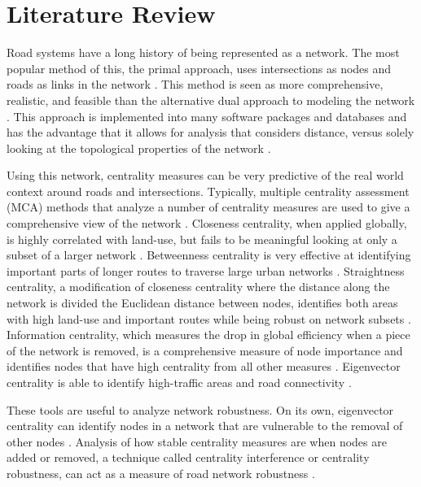 \documentclass[11pt]{article}
\numberwithin{equation}{section} %
\numberwithin{figure}{section} %
\numberwithin{table}{section} %
\theoremstyle{definition}
\begin{document}
\section{Literature Review} \label{sec:lit_review}

Road systems have a long history of being represented as a network. The most popular method of this, the primal approach, uses intersections as nodes and roads as links in the network \parencites{Porta06}{Ding19}. This method is seen as more comprehensive, realistic, and feasible than the alternative dual approach to modeling the network \parencites{Porta06}{Porta06b}. This approach is implemented into many software packages and databases \parencites{Esri}{Boeing17} and has the advantage that it allows for analysis that considers distance, versus solely looking at the topological properties of the network \parencites{Ding19}{Erath09}{Wang11}{Barthelemy09}.

Using this network, centrality measures can be very predictive of the real world context around roads and intersections. Typically, multiple centrality assessment (MCA) methods that analyze a number of centrality measures are used to give a comprehensive view of the network \parencites{Porta06}{Porta07}. Closeness centrality, when applied globally, is highly correlated with land-use, but fails to be meaningful looking at only a subset of a larger network \parencites{Wang11}{Porta06}{Barthelemy09}. Betweenness centrality is very effective at identifying important parts of longer routes to traverse large urban networks \parencite{Porta06}. Straightness centrality, a modification of closeness centrality where the distance along the network is divided the Euclidean distance between nodes, identifies both areas with high land-use and important routes while being robust on network subsets \parencites{Porta06}{Wang11}. Information centrality, which measures the drop in global efficiency when a piece of the network is removed, is a comprehensive measure of node importance and identifies nodes that have high centrality from all other measures \parencite{Porta06}. Eigenvector centrality is able to identify high-traffic areas and road connectivity \parencites{Jayaweera17}{Ando21}.

These tools are useful to analyze network robustness. On its own, eigenvector centrality can identify nodes in a network that are vulnerable to the removal of other nodes \parencite{Ando20}. Analysis of how stable centrality measures are when nodes are added or removed, a technique called centrality interference or centrality robustness, can act as a measure of road network robustness \parencite{Scardoni13}.
\end{document}

